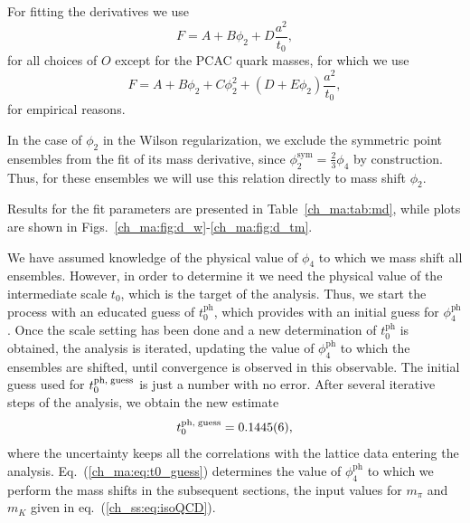 For fitting the derivatives we use
\begin{equation}
\label{ch_ma:eq:md_1}
F=A+B\phi_2+D\frac{a^2}{t_0},
\end{equation}
for all choices of ${O}$ except for the PCAC quark masses, for which we use
\begin{equation}
\label{ch_ma:eq:md_2}
F=A+B\phi_2+C\phi_2^2+(D+E\phi_2)\frac{a^2}{t_0},
\end{equation}
for empirical reasons.

In the case of $\phi_2$ in the Wilson regularization, we exclude the symmetric point ensembles from the fit of its mass derivative, since $\phi_2^{\textrm{sym}}=\frac{2}{3}\phi_4$ by construction. Thus, for these ensembles we will use this relation directly to mass shift $\phi_2$.

Results for the fit parameters are presented in Table~\ref{ch_ma:tab:md}, while plots are shown in Figs.~\ref{ch_ma:fig:d_w}-\ref{ch_ma:fig:d_tm}.

We have assumed knowledge of the physical value of $\phi_4$ to which we mass shift all ensembles. However, in order to determine it we need the physical value of the intermediate scale $t_0$, which is the target of the analysis. Thus, we start the process with an educated guess of $t_0^{\textrm{ph}}$, which provides with an initial guess for $\phi_4^{\textrm{ph}}$. Once the scale setting has been done and a new determination of $t_0^{\textrm{ph}}$ is obtained, the analysis is iterated, updating the value of $\phi_4^{\textrm{ph}}$ to which the ensembles are shifted, until convergence is observed in this observable. The initial guess used for $t_0^{\textrm{ph,\;guess}}$ is just a number with no error. After several iterative steps of the analysis, we obtain the new estimate
\begin{equation}
\label{ch_ma:eq:t0_guess}
t_0^{\textrm{ph,\;guess}}=0.1445(6),
\end{equation}
where the uncertainty keeps all the correlations with the lattice data entering the analysis. Eq.~(\ref{ch_ma:eq:t0_guess}) determines the value of $\phi_4^{\textrm{ph}}$ to which we perform the mass shifts in the subsequent sections, the input values for $m_{\pi}$ and $m_K$ given in eq.~(\ref{ch_ss:eq:isoQCD}). 

